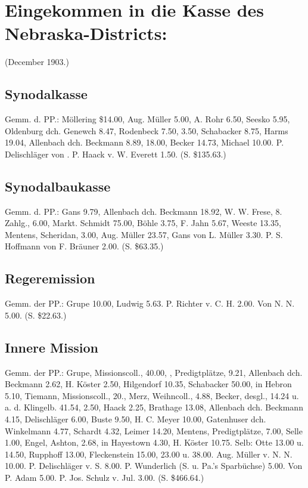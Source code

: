 \chapter[Kasse des Nebraska-Districts:]{Eingekommen in die Kasse des Nebraska-Districts:}

(December 1903.)

\section{Synodalkasse}

Gemm. d. PP.: Möllering \$14.00, Aug. Müller 5.00, A. Rohr 6.50, Seesko 5.95, Oldenburg dch. Genewch 8.47, Rodenbeck 7.50,  3.50, Schabacker 8.75, Harms 19.04, Allenbach dch. Beckmann 8.89,  18.00, Becker 14.73, Michael 10.00. P. Delischläger von . P. Haack v. W. Everett 1.50. (S. \$135.63.)

\section{Synodalbaukasse}

Gemm. d. PP.: Gans 9.79, Allenbach dch. Beckmann 18.92, W. W. Frese, 8. Zahlg., 6.00, Markt. Schmidt 75.00, Böhle 3.75, F. Jahn 5.67, Weeste 13.35, Mentens, Scheridan, 3.00, Aug. Müller 23.57, Gans von L. Müller 3.30. P. S. Hoffmann von F. Bräuner 2.00. (S. \$63.35.)

\section{Regeremission}

Gemm. der PP.: Grupe 10.00, Ludwig 5.63. P. Richter v. C. H. 2.00. Von N. N. 5.00. (S. \$22.63.)

\section{Innere Mission}

Gemm. der PP.: Grupe, Missionscoll., 40.00, , Predigtplätze, 9.21, Allenbach dch. Beckmann 2.62, H. Köster 2.50, Hilgendorf 10.35, Schabacker 50.00, in Hebron 5.10, Tiemann, Missionscoll., 20., Merz, Weihncoll., 4.88, Becker, desgl., 14.24 u. a. d. Klingelb. 41.54,  2.50, Haack 2.25, Brathage 13.08, Allenbach dch. Beckmann 4.15, Delischläger 6.00, Buste 9.50, H. C. Meyer 10.00, Gatenhuser dch. Winkelmann 4.77, Schardt 4.32, Leimer 14.20, Mentens, Predigtplätze, 7.00, Selle 1.00, Engel, Ashton, 2.68, in Hayestown 4.30, H. Köster 10.75. Selb: Otte 13.00 u. 14.50, Rupphoff 13.00, Fleckenstein 15.00, 23.00 u. 38.00. Aug. Müller v. N. N. 10.00. P. Delischläger v. S. 8.00. P. Wunderlich (S. u. Pa.’s Sparbüchse) 5.00. Von P. Adam 5.00. P. Jos. Schulz v. Jul.  3.00. (S. \$466.64.)

